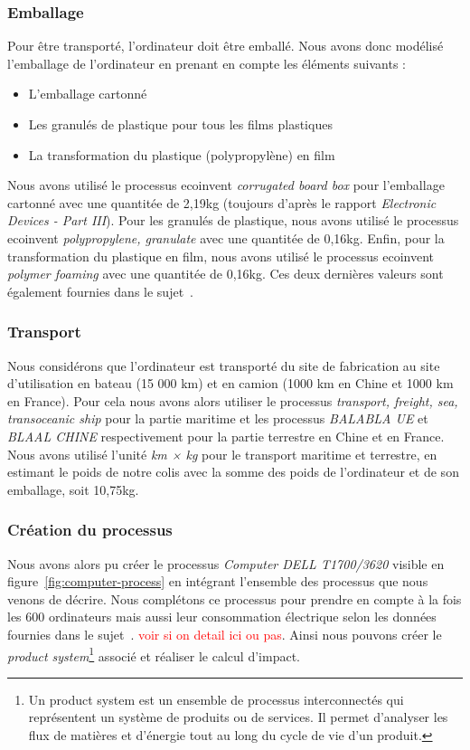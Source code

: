 \documentclass[12pt,a4paper]{paper}
\begin{document}
\subsubsection{Emballage}
Pour être transporté, l'ordinateur doit être emballé. Nous avons donc modélisé l'emballage de l'ordinateur en prenant en compte les éléments suivants :
\begin{itemize}
    \item L'emballage cartonné
    \item Les granulés de plastique pour tous les films plastiques
    \item La transformation du plastique (polypropylène) en film
\end{itemize}
Nous avons utilisé le processus ecoinvent \textit{corrugated board box} pour l'emballage cartonné avec une quantitée de 2,19kg (toujours d'après le rapport \textit{Electronic Devices - Part III}\cite{Lehmann2007}). Pour les granulés de plastique, nous avons utilisé le processus ecoinvent \textit{polypropylene,
granulate} avec une quantitée de 0,16kg. Enfin, pour la transformation du plastique en film, nous avons utilisé le processus ecoinvent \textit{polymer foaming} avec une quantitée de 0,16kg. Ces deux dernières valeurs sont également fournies dans le sujet~\cite{TP2_ACV_ENSEIRB-MATMECA}.

\subsubsection{Transport}
Nous considérons que l'ordinateur est transporté du site de fabrication au site d'utilisation en bateau (15 000 km) et en camion (1000 km en Chine et 1000 km en France). Pour cela nous avons alors utiliser le processus \textit{transport, freight, sea, transoceanic ship} pour la partie maritime et les processus \textit{BALABLA UE} et \textit{BLAAL CHINE} respectivement pour la partie terrestre en Chine et en France. Nous avons utilisé l'unité \textit{km × kg} pour le transport maritime et terrestre, en estimant le poids de notre colis avec la somme des poids de l'ordinateur et de son emballage, soit 10,75kg.


\subsubsection{Création du processus}
Nous avons alors pu créer le processus \textit{Computer DELL T1700/3620} visible en figure~\ref{fig:computer-process} en intégrant l'ensemble des processus que nous venons de décrire. Nous complétons ce processus pour prendre en compte à la fois les 600 ordinateurs mais aussi leur consommation électrique selon les données fournies dans le sujet~\cite{TP2_ACV_ENSEIRB-MATMECA}. \textcolor{red}{voir si on detail ici ou pas}. Ainsi nous pouvons créer le \textit{product system}\footnote{Un product system est un ensemble de processus interconnectés qui représentent un système de produits ou de services. Il permet d'analyser les flux de matières et d'énergie tout au long du cycle de vie d'un produit.} associé et réaliser le calcul d'impact.
\end{document}
